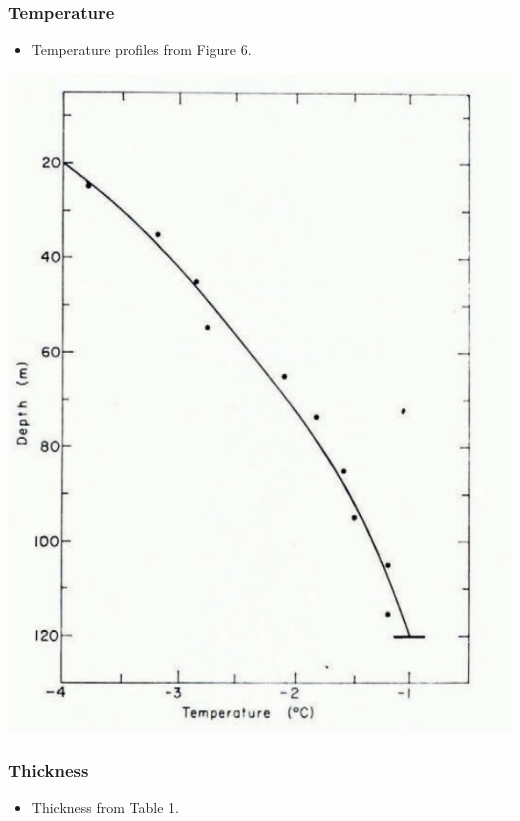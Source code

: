 \documentclass[article,a4paper,times,11pt,twoside]{article}
\begin{document}
\subsubsection{Temperature}
\label{sec:orgaae8da4}

\begin{itemize}
\item Temperature profiles from \textcite{colbeck_1979} Figure 6.
\end{itemize}

\begin{center}
\includegraphics[width=.9\linewidth]{isua_11/isua_11.png}
\end{center}

\subsubsection{Thickness}
\label{sec:orge77507e}

\begin{itemize}
\item Thickness from \textcite{colbeck_1979} Table 1.
\end{itemize}
\end{document}
